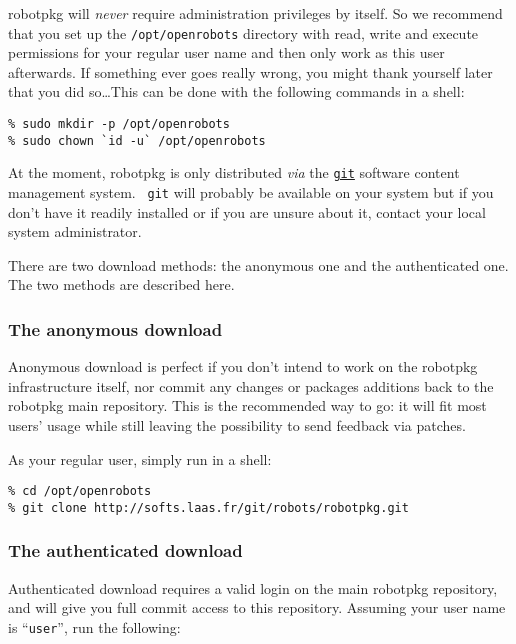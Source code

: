 robotpkg  will {\em never} require administration  privileges by itself.  So we
recommend that you set up the {\tt  /opt/openrobots} directory with read, write
and execute permissions for your regular user  name and then  only work as this
user afterwards. If something ever goes really  wrong, you might thank yourself
later that you did so\ldots This  can be done with  the following commands in a
shell:

\begin{verbatim}
% sudo mkdir -p /opt/openrobots
% sudo chown `id -u` /opt/openrobots
\end{verbatim}

At  the    moment,  robotpkg   is      only   distributed    {\em  via}     the
\href{http://git-scm.com/}{\tt git}  software content  management  system. {\tt
git} will probably be available on your system but if you don't have it readily
installed   or if  you  are   unsure  about  it,   contact your  local   system
administrator.

There are two download methods: the anonymous one and the authenticated
one. The two methods are described here.


\subsubsection{The anonymous download}

Anonymous  download is perfect  if  you don't intend  to  work on  the robotpkg
infrastructure itself, nor commit any changes or packages additions back to the
robotpkg main repository.  This is the recommended way  to go: it will fit most
users' usage while still leaving the possibility to send feedback via patches.

As your regular user, simply run in a shell:

\begin{verbatim}
% cd /opt/openrobots
% git clone http://softs.laas.fr/git/robots/robotpkg.git
\end{verbatim}


\subsubsection{The authenticated download}

Authenticated download requires a valid login  on the main robotpkg repository,
and  will give you  full commit access to this   repository. Assuming your user
name is ``{\tt user}'', run the following:

